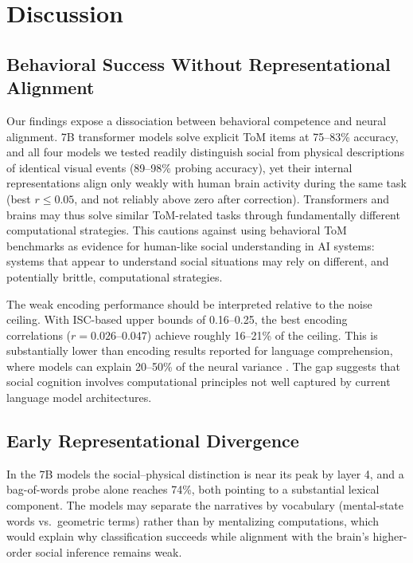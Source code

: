 \documentclass[conference]{IEEEtran}
\begin{document}
\section{Discussion}

\subsection{Behavioral Success Without Representational Alignment}

Our findings expose a dissociation between behavioral competence and neural alignment. 7B transformer models solve explicit ToM items at 75--83\% accuracy, and all four models we tested readily distinguish social from physical descriptions of identical visual events (89--98\% probing accuracy), yet their internal representations align only weakly with human brain activity during the same task (best $r \le 0.05$, and not reliably above zero after correction). Transformers and brains may thus solve similar ToM-related tasks through fundamentally different computational strategies. This cautions against using behavioral ToM benchmarks as evidence for human-like social understanding in AI systems: systems that appear to understand social situations may rely on different, and potentially brittle, computational strategies.

The weak encoding performance should be interpreted relative to the noise ceiling. With ISC-based upper bounds of 0.16--0.25, the best encoding correlations ($r = 0.026$--$0.047$) achieve roughly 16--21\% of the ceiling. This is substantially lower than encoding results reported for language comprehension, where models can explain 20--50\% of the neural variance \cite{schrimpf2021neural, caucheteux2022brains, goldstein2022shared}. The gap suggests that social cognition involves computational principles not well captured by current language model architectures.

\subsection{Early Representational Divergence}

In the 7B models the social--physical distinction is near its peak by layer 4, and a bag-of-words probe alone reaches 74\%, both pointing to a substantial lexical component. The models may separate the narratives by vocabulary (mental-state words vs.\ geometric terms) rather than by mentalizing computations, which would explain why classification succeeds while alignment with the brain's higher-order social inference remains weak.
\end{document}
